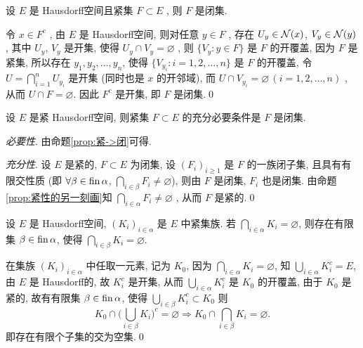      \begin{Proposition}\label{prop:紧->闭}
          设 $ E $ 是 Hausdorff空间且紧集 $ F\subset E $ , 则 $ F $ 是闭集. 
     \end{Proposition}

     \begin{Proof}
          令 $ x\in F^{c} $ , 由 $ E $ 是 Hausdorff空间, 则对任意 $  y\in F $ , 存在 $ U_{y}\in\mathcal{N}(x) $, $ V_{y}\in\mathcal{N}(y) $ , 其中 $ U_{y} $, $ V_{y} $ 是开集, 使得 $ U_{y}\cap V_{y}=\varnothing $ , 则 $\{ V_{y}:y\in F \}$ 是 $ F $ 的开覆盖, 因为 $ F $ 是紧集, 所以存在 $ y_{1}, y_{2}, \dots, y_{n} $, 使得 $ \{ V_{y_{i}}: i=1, 2, \dots, n \} $ 是 $ F $ 的开覆盖, 令 $ U=\bigcap_{i=1}^{n}U_{y_{i}} $ 是开集 (同时也是 $ x $ 的开邻域), 而 $ U\cap V_{y_{i}}=\varnothing\,(i=1, 2, \dots, n) $ , 从而 $ U\cap F=\varnothing $. 因此 $ F^{c} $ 是开集, 即 $ F $ 是闭集.\qed
     \end{Proof}

     \begin{Proposition}
          设 $ E $ 是紧 Hausdorff空间, 则紧集 $ F\subset E $ 的充分必要条件是 $ F $ 是闭集. 
     \end{Proposition}
     
     \begin{Proof}
          \textsl{必要性}. 由命题\ref{prop:紧->闭}可得.

          \textsl{充分性}. 设 $ E $ 是紧的, $ F\subset E $ 为闭集, 设 $ (F_{i})_{i\geqslant1} $ 是 $ F $ 的一族闭子集, 且具有有限交性质 (即 $ \forall \beta\in\operatorname{fin}\alpha $, $ \bigcap_{i\in\beta}F_{i}\neq\varnothing $), 则由 $ F $ 是闭集,  $ F_{i} $ 也是闭集. 由命题\ref{prop:紧性的另一刻画}知 $ \bigcap_{i\in\alpha}F_{i}\neq\varnothing $ , 从而 $ F $ 是紧的.\qed
     \end{Proof}

     \begin{Proposition}
          设 $ E $ 是 Hausdorff空间,  $ (K_{i})_{i\in\alpha} $ 是 $ E $ 中紧集族. 若 $ \bigcap_{i\in\alpha}K_{i}=\varnothing $, 则存在有限集 $ \beta\in\operatorname{fin}\alpha $, 使得 $ \bigcap_{i\in\beta}K_{i}=\varnothing $.   
     \end{Proposition}
     
     \begin{Proof}
          在集族 $ (K_{i})_{i\in\alpha} $ 中任取一元素, 记为 $ K_{0} $, 因为 $ \bigcap_{i\in\alpha}K_{i}=\varnothing $, 
          知 $ \bigcup_{i\in\alpha}K_{i}^{c}=E $, 由 $ E $ 是 Hausdorff的, 故 $ K_{i}^{c} $ 是开集, 从而 $ \bigcup_{i\in\alpha}K_{i}^{c} $ 是 $ K_{0} $ 的开覆盖, 由于 $ K_{0} $ 是紧的, 故有有限集 $ \beta\in\operatorname{fin}\alpha $, 使得 $ \bigcup_{i\in\beta}K_{i}^{c}\subset K_{0} $ 则
          \[
               K_{0}\cap \bigg( \bigcup_{i\in\beta}K_{i} \bigg)^{c}=\varnothing \Rightarrow K_{0}\cap\bigcap_{i\in\beta}K_{i}=\varnothing.
          \]
          即存在有限个子集的交为空集.\qed
     \end{Proof}

